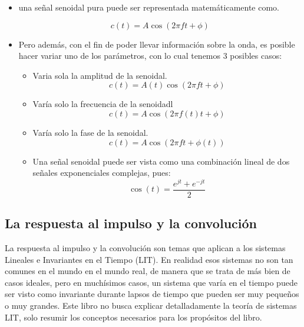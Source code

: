 \begin{itemize}
\item  una señal senoidal pura puede ser representada matemáticamente como.

 \begin{equation}  \label{eu_eqn}
 c(t)=A\cos(2 \pi f t + \phi)
 \end{equation}

\item  Pero además, con el fin de poder llevar información sobre la onda, es posible hacer variar uno de los parámetros, con lo cual tenemos 3 posibles casos:

   \begin{itemize}
   \item  Varia sola la amplitud de la senoidal. 
   		\begin{equation} \label{equ_uno}
   			c(t)=A(t)\cos(2 \pi f t+ \phi)
    	\end{equation}
   \item  Varía solo la frecuencia de la senoidadl
         \begin{equation} \label{equ_dos}
         	c(t)=A\cos(2 \pi f(t) t+ \phi)
         \end{equation}
   \item  Varía solo la fase de la senoidal.
         \begin{equation} \label{equ_tres}
         	c(t)=A \cos(2 \pi f t+\phi(t))
         \end{equation} 
\item  Una señal senoidal puede ser vista como una combinación lineal de dos señales exponenciales complejas, pues:
\begin{equation} \label{equ_cuartro}
	\cos(t)=\frac{e^{jt}+e^{-jt}}{2} 
\end{equation}

   \end{itemize}
\end{itemize}


\subsection{La respuesta al impulso y la convolución}

La respuesta al impulso y la convolución son temas que aplican a los sistemas Lineales e Invariantes en el Tiempo (LIT). En realidad esos sistemas no son tan comunes en el mundo en el mundo real, de manera que se trata de más bien de casos ideales, pero en muchísimos casos, un sistema que varía en el tiempo puede ser visto como invariante durante lapsos de tiempo que pueden ser muy pequeños o muy grandes. Este libro no busca explicar detalladamente la teoría de sistemas LIT, solo resumir los conceptos necesarios para los propósitos del libro.
